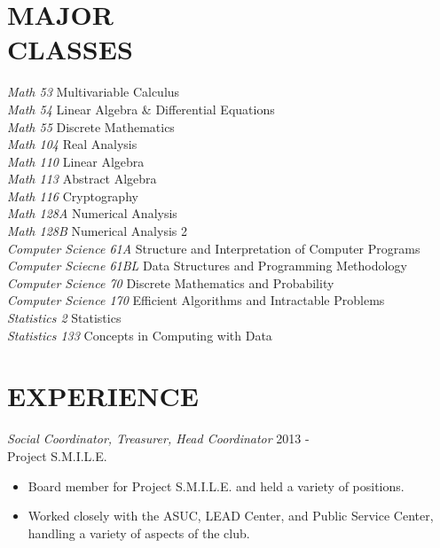 \documentclass[margin]{res}
\begin{document}
\begin{resume}
\section{MAJOR \\ CLASSES}             
                {\sl Math 53} Multivariable Calculus\\
                {\sl Math 54} Linear Algebra \& Differential Equations\\
								{\sl Math 55} Discrete Mathematics\\
                {\sl Math 104} Real Analysis\\
								{\sl Math 110} Linear Algebra\\
                {\sl Math 113} Abstract Algebra\\
				{\sl Math 116} Cryptography\\
				{\sl Math 128A} Numerical Analysis\\
                {\sl Math 128B} Numerical Analysis 2\\
                {\sl Computer Science 61A} Structure and Interpretation of Computer Programs\\
								{\sl Computer Sciecne 61BL} Data Structures and Programming Methodology\\
								{\sl Computer Science 70} Discrete Mathematics and Probability\\
                {\sl Computer Science 170} Efficient Algorithms and Intractable Problems\\
                {\sl Statistics 2} Statistics\\
                {\sl Statistics 133} Concepts in Computing with Data\\
								
\section{EXPERIENCE} {\sl Social Coordinator, Treasurer, Head Coordinator} \hfill            2013 -\\
                Project S.M.I.L.E.
                 \begin{itemize}  \itemsep -2pt %
                 \item Board member for Project S.M.I.L.E. and
                                held a variety of positions.
                \item Worked closely with the ASUC, LEAD Center, and Public Service Center, handling a variety of aspects of the club.
                 \end{itemize}


\end{resume}
\end{document}
